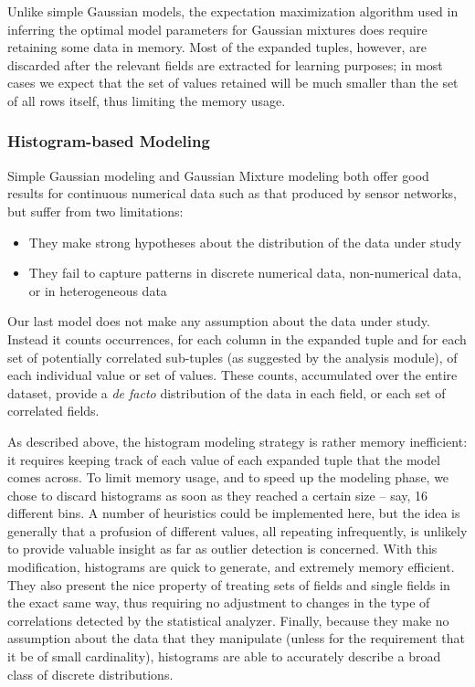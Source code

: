 Unlike simple Gaussian models, the expectation maximization algorithm used in inferring the optimal model parameters for Gaussian mixtures does require retaining some data in memory. Most of the expanded tuples, however, are discarded after the relevant fields are extracted for learning purposes; in most cases we expect that the set of values retained will be much smaller than the set of all rows itself, thus limiting the memory usage.

\subsubsection{Histogram-based Modeling}
Simple Gaussian modeling and Gaussian Mixture modeling both offer good results for continuous numerical data such as that produced by sensor networks, but suffer from two limitations:

\begin{itemize}
\item They make strong hypotheses about the distribution of the data under study
\item They fail to capture patterns in discrete numerical data, non-numerical data, or in heterogeneous data
\end{itemize}

Our last model does not make any assumption about the data under study. Instead it counts occurrences, for each column in the expanded tuple and for each set of potentially correlated sub-tuples (as suggested by the analysis module), of each individual value or set of values. These counts, accumulated over the entire dataset, provide a \emph{de facto} distribution of the data in each field, or each set of correlated fields. 

As described above, the histogram modeling strategy is rather memory inefficient: it requires keeping track of each value of each expanded tuple that the model comes across. To limit memory usage, and to speed up the modeling phase, we chose to discard histograms as soon as they reached a certain size -- say, 16 different bins. A number of heuristics could be implemented here, but the idea is generally that a profusion of different values, all repeating infrequently, is unlikely to provide valuable insight as far as outlier detection is concerned. With this modification, histograms are quick to generate, and extremely memory efficient. They also present the nice property of treating sets of fields and single fields in the exact same way, thus requiring no adjustment to changes in the type of correlations detected by the statistical analyzer. Finally, because they make no assumption about the data that they manipulate (unless for the requirement that it be of small cardinality), histograms are able to accurately describe a broad class of discrete distributions.


